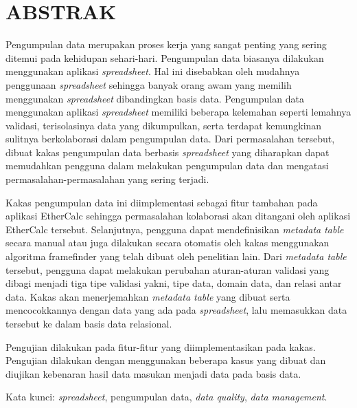 \clearpage
\chapter*{ABSTRAK}


Pengumpulan data merupakan proses kerja yang sangat penting yang sering ditemui pada kehidupan sehari-hari. Pengumpulan data biasanya dilakukan menggunakan aplikasi \textit{spreadsheet}. Hal ini disebabkan oleh mudahnya penggunaan \textit{spreadsheet} sehingga banyak orang awam yang memilih menggunakan \textit{spreadsheet} dibandingkan basis data. Pengumpulan data menggunakan aplikasi \textit{spreadsheet} memiliki beberapa kelemahan seperti lemahnya validasi, terisolasinya data yang dikumpulkan, serta terdapat kemungkinan sulitnya berkolaborasi dalam pengumpulan data. Dari permasalahan tersebut, dibuat kakas pengumpulan data berbasis \textit{spreadsheet} yang diharapkan dapat memudahkan pengguna dalam melakukan pengumpulan data dan mengatasi permasalahan-permasalahan yang sering terjadi.

Kakas pengumpulan data ini diimplementasi sebagai fitur tambahan pada aplikasi EtherCalc sehingga permasalahan kolaborasi akan ditangani oleh aplikasi EtherCalc tersebut. Selanjutnya, pengguna dapat mendefinisikan \textit{metadata table} secara manual atau juga dilakukan secara otomatis oleh kakas menggunakan algoritma framefinder yang telah dibuat oleh penelitian lain. Dari \textit{metadata table} tersebut, pengguna dapat melakukan perubahan aturan-aturan validasi yang dibagi menjadi tiga tipe validasi yakni, tipe data, domain data, dan relasi antar data. Kakas akan menerjemahkan \textit{metadata table} yang dibuat serta mencocokkannya dengan data yang ada pada \textit{spreadsheet}, lalu memasukkan data tersebut ke dalam basis data relasional.

Pengujian dilakukan pada fitur-fitur yang diimplementasikan pada kakas. Pengujian dilakukan dengan menggunakan beberapa kasus yang dibuat dan diujikan kebenaran hasil data masukan menjadi data pada basis data.

\vspace{15mm}
Kata kunci: \textit{spreadsheet}, pengumpulan data, \textit{data quality}, \textit{data management}.
\clearpage